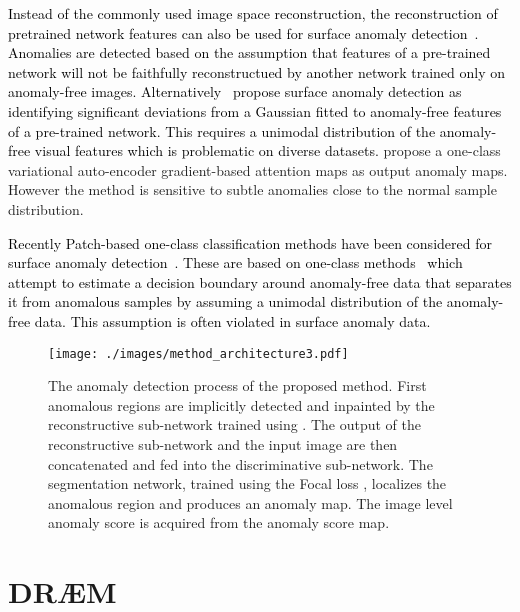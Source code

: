 \documentclass[10pt,twocolumn,letterpaper]{article}
\newcommand\ntxt[1]{\textcolor{black}{#1}}
\begin{document}
\ntxt{Instead of the commonly used image space reconstruction, the reconstruction of pretrained network features can also be used for surface anomaly detection~\cite{bergmann2020uninformed,dfrAD}. Anomalies are detected based on the assumption that features of a pre-trained network will not be faithfully reconstructued by another network trained only on anomaly-free images.  Alternatively~\cite{madGauss,defard2020padim} propose surface anomaly detection as identifying significant deviations from a Gaussian fitted to anomaly-free features of a pre-trained network. This requires a unimodal distribution of the anomaly-free visual features which is problematic on diverse datasets.} \cite{liu2020towards} propose a one-class variational auto-encoder gradient-based attention maps as output anomaly maps. However the method is sensitive to subtle anomalies close to the normal sample distribution. 




\ntxt{Recently Patch-based one-class classification methods have been considered for surface anomaly detection~\cite{yi2020patch}. These are based on one-class methods~\cite{pmlr-v80-ruff18a, chalapathy2018anomaly} which attempt to estimate a decision boundary around anomaly-free data that separates it from anomalous samples by assuming a unimodal distribution of the anomaly-free data. This assumption is often violated in surface anomaly data.}



\begin{figure*}
\centering
  \texttt{[image: ./images/method\_architecture3.pdf]}
\caption{The anomaly detection process of the proposed method. First anomalous regions are implicitly detected and inpainted by the reconstructive sub-network trained using . The output of the reconstructive sub-network and the input image are then concatenated and fed into the discriminative sub-network. The segmentation network, trained using the Focal loss \cite{lin2017focal}, localizes the anomalous region and produces an anomaly map. The image level anomaly score  is acquired from the anomaly score map.
}
\label{fig:process}
\end{figure*}





\section{DR{\AE}M}
\end{document}
